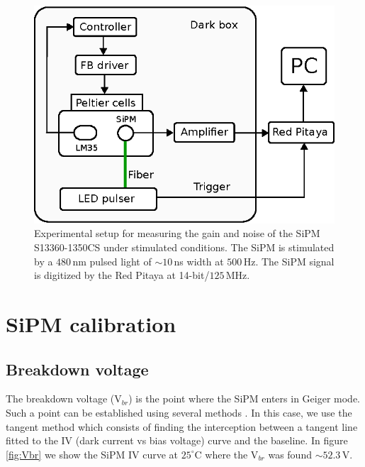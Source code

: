 \documentclass[a4paper,11pt]{article}
\begin{document}
\begin{figure}[htbp]
\centering %
\includegraphics[width=.6\textwidth]{Figures/ExpSet2.eps}
\caption{\label{fig:setup2} Experimental setup for measuring the gain and noise of the SiPM S13360-1350CS under stimulated conditions. The SiPM is stimulated by a $480$\,nm pulsed light of $\sim10$\,ns width at $500$\,Hz. The SiPM signal is digitized by the Red Pitaya at 14-bit/$125$\,MHz.}
\end{figure}



\section{SiPM calibration}
\label{sec:res}

\subsection{Breakdown voltage}
The breakdown voltage (V$_{br}$) is the point where the SiPM enters in Geiger mode. Such a point can be established using several methods \cite{Nagy2017}. In this case, we use the tangent method which consists of finding the interception between a tangent line fitted to the IV (dark current vs bias voltage) curve and the baseline. In figure \ref{fig:Vbr} we show the SiPM IV curve at $25^{\circ}$C where the V$_{br}$ was found $\sim52.3$\,V.
\end{document}
